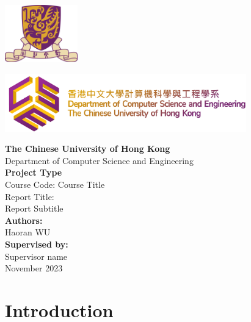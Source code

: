 \documentclass{article}
\begin{document}
\begin{titlepage}
    \centering

    \hspace*{-2.0in}
    \begin{minipage}{0.3\textwidth}
        \centering
        \includegraphics[height=2.5cm]{cuhklogo.png}
    \end{minipage}
    \begin{minipage}{0.3\textwidth}
        \centering
        \includegraphics[height=2.5cm]{cselogo.png}
    \end{minipage}

    \vspace{1.5cm}

    {\color{cuhkpurple} \LARGE \textbf{The Chinese University of Hong Kong}}\\[0.5cm]
    {\color{cuhkpurple} \Large Department of Computer Science and Engineering}\\[1.5cm]

    {\large \textbf{Project Type}}\\[0.8cm]
    {\large Course Code: Course Title}\\[0.8cm]
    {\large Report Title:}\\
    {\large Report Subtitle}\\[1.5cm]

    {\large \textbf{Authors:}}\\
    Haoran WU\\[1.2cm]

    {\large \textbf{Supervised by:}}\\
    Supervisor name\\[2cm]

    {\large November 2023}

\end{titlepage}

\section{Introduction}
\end{document}
